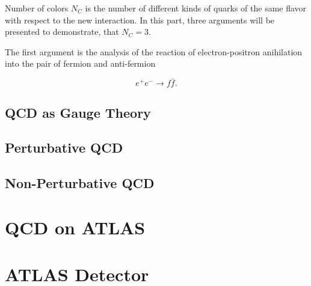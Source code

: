 \documentclass[a4paper,11pt]{report}
\begin{document}
Number of colors $N_C$ is the number of different kinds of quarks of the same
flavor with respect to the new interaction. In this part, three arguments will
be presented to demonstrate, that $N_C = 3$.

The first argument is the analysis of the reaction of electron-positron
anihilation into the pair of fermion and anti-fermion

\begin{equation}
  e^+e^- \rightarrow f\bar{f}.
  \label{ElectronPositronAnihilation}
\end{equation}

\section{QCD as Gauge Theory}

\section{Perturbative QCD}

\section{Non-Perturbative QCD}


\chapter{QCD on ATLAS}

\chapter{ATLAS Detector}
\label{ch:intro}


\clearpage
\listoffigures
{}


\clearpage
\listoftables
{}



\clearpage


\end{document}
